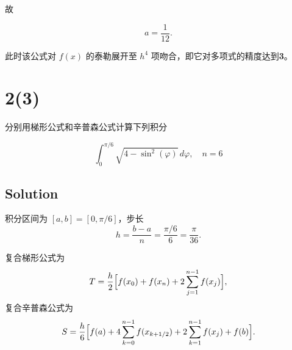 \documentclass[11pt]{article}
\begin{document}
故

\[\boxed{
a=\frac{1}{12}.
}
\]

此时该公式对 \(f(x)\) 的泰勒展开至 \(h^4\)
项吻合，即它对多项式的精度达到\textbf{3}。

    \section{2(3)}\label{section}

分别用梯形公式和辛普森公式计算下列积分

\[
\int_{0}^{\pi /6} \sqrt{4 - \sin^2(\varphi)} \,d\varphi, \quad n = 6
\]

\subsection{Solution}\label{solution}

积分区间为 \([a, b] = [0, \pi/6]\)，步长\\
\[
h = \frac{b-a}{n}=\frac{\pi/6}{6}=\frac{\pi}{36}.
\]

复合梯形公式为\\
\[
T = \frac{h}{2}\Bigl[f(x_0)+f(x_n)+2\sum_{j=1}^{n-1}f(x_j)\Bigr],
\] 复合辛普森公式为\\
\[
S = \frac{h}{6}\Bigl[f(a)+4\sum_{k = 0}^{n - 1}f(x_{k + 1/2})+2\sum_{k=1}^{n-1}f(x_j) + f(b)\Bigr].
\]
\end{document}

